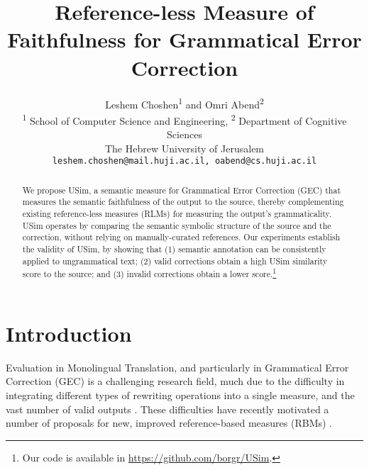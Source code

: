 \documentclass[a4paper, 11pt]{article}
\begin{document}
\title{Reference-less Measure of Faithfulness for Grammatical Error Correction}
\author{
  Leshem Choshen\textsuperscript{1} and Omri Abend\textsuperscript{2} \\
  \textsuperscript{1} School of Computer Science and Engineering,
  \textsuperscript{2} Department of Cognitive Sciences \\
  The Hebrew University of Jerusalem \\
  \texttt{leshem.choshen@mail.huji.ac.il, oabend@cs.huji.ac.il}\\
}
\maketitle

\begin{abstract}
  We propose {\sc USim}, a semantic measure for Grammatical Error Correction (GEC)
  that measures the semantic faithfulness of the output to the source,
  thereby complementing existing reference-less measures (RLMs) for measuring the output's grammaticality.
  {\sc USim} operates by comparing the semantic symbolic structure of the source and the correction,
	without relying on manually-curated references.
  Our experiments establish the validity of {\sc USim},
  by showing that (1) semantic annotation can be consistently applied to ungrammatical text; (2)
  valid corrections obtain a high {\sc USim} similarity score to the source; and (3)
  invalid corrections obtain a lower score.\footnote{Our code is available in \url{https://github.com/borgr/USim}.}
\end{abstract}


\section{Introduction}

Evaluation in Monolingual Translation, and particularly in Grammatical Error Correction (GEC) is a challenging
research field, much due to the difficulty in integrating 
different types of rewriting operations into a single measure, and the vast number of valid outputs
\cite{tetreault2008native,madnani2011they,chodorow2012problems,bryant2015far}.
These difficulties have recently motivated
a number of proposals for new, improved reference-based measures (RBMs)  \cite{dahlmeier2012better,felice2015towards,napoles2015ground}.
\end{document}
